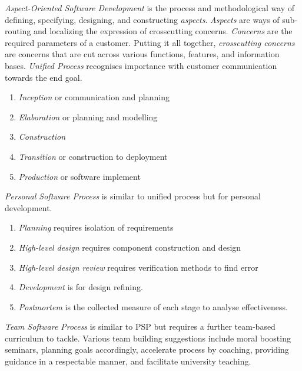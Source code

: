 \documentclass[12pt]{article}
\begin{document}
\emph{Aspect-Oriented Software Development} is the process and methodological way of defining, specifying, designing, and constructing \emph{aspects}.
\emph{Aspects} are ways of sub-routing and localizing the expression of crosscutting concerns.
\emph{Concerns} are the required parameters of a customer.
Putting it all together, \emph{crosscutting concerns} are concerns that are cut across various functions, features, and information bases.
\emph{Unified Process} recognises importance with customer communication towards the end goal.
    \begin{enumerate}
        \item \emph{Inception} or communication and planning
        \item \emph{Elaboration} or planning and modelling
        \item \emph{Construction}
        \item \emph{Transition} or construction to deployment
        \item \emph{Production} or software implement
    \end{enumerate}
\emph{Personal Software Process} is similar to unified process but for personal development.
    \begin{enumerate}
        \item \emph{Planning} requires isolation of requirements
        \item \emph{High-level design} requires component construction and design
        \item \emph{High-level design review} requires verification methods to find error
        \item \emph{Development} is for design refining.
        \item \emph{Postmortem} is the collected measure of each stage to analyse effectiveness.
    \end{enumerate}
\emph{Team Software Process} is similar to PSP but requires a further team-based curriculum to tackle. Various team building suggestions include moral boosting seminars, planning goals accordingly, accelerate process by coaching, providing guidance in a respectable manner, and facilitate university teaching.
\end{document}
